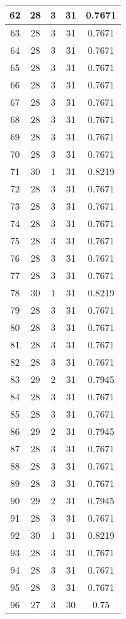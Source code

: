 \documentclass[letterpaper, 12pt]{article}
\begin{document}
\begin{longtable}{|c|c|c|c|c|}
\hline
62 & 28 & 3 & 31 & 0.7671 \\
\hline
63 & 28 & 3 & 31 & 0.7671 \\
\hline
64 & 28 & 3 & 31 & 0.7671 \\
\hline
65 & 28 & 3 & 31 & 0.7671 \\
\hline
66 & 28 & 3 & 31 & 0.7671 \\
\hline
67 & 28 & 3 & 31 & 0.7671 \\
\hline
68 & 28 & 3 & 31 & 0.7671 \\
\hline
69 & 28 & 3 & 31 & 0.7671 \\
\hline
70 & 28 & 3 & 31 & 0.7671 \\
\hline
71 & 30 & 1 & 31 & 0.8219 \\
\hline
72 & 28 & 3 & 31 & 0.7671 \\
\hline
73 & 28 & 3 & 31 & 0.7671 \\
\hline
74 & 28 & 3 & 31 & 0.7671 \\
\hline
75 & 28 & 3 & 31 & 0.7671 \\
\hline
76 & 28 & 3 & 31 & 0.7671 \\
\hline
77 & 28 & 3 & 31 & 0.7671 \\
\hline
78 & 30 & 1 & 31 & 0.8219 \\
\hline
79 & 28 & 3 & 31 & 0.7671 \\
\hline
80 & 28 & 3 & 31 & 0.7671 \\
\hline
81 & 28 & 3 & 31 & 0.7671 \\
\hline
82 & 28 & 3 & 31 & 0.7671 \\
\hline
83 & 29 & 2 & 31 & 0.7945 \\
\hline
84 & 28 & 3 & 31 & 0.7671 \\
\hline
85 & 28 & 3 & 31 & 0.7671 \\
\hline
86 & 29 & 2 & 31 & 0.7945 \\
\hline
87 & 28 & 3 & 31 & 0.7671 \\
\hline
88 & 28 & 3 & 31 & 0.7671 \\
\hline
89 & 28 & 3 & 31 & 0.7671 \\
\hline
90 & 29 & 2 & 31 & 0.7945 \\
\hline
91 & 28 & 3 & 31 & 0.7671 \\
\hline
92 & 30 & 1 & 31 & 0.8219 \\
\hline
93 & 28 & 3 & 31 & 0.7671 \\
\hline
94 & 28 & 3 & 31 & 0.7671 \\
\hline
95 & 28 & 3 & 31 & 0.7671 \\
\hline
96 & 27 & 3 & 30 & 0.75 \\

\end{longtable}
\end{document}
